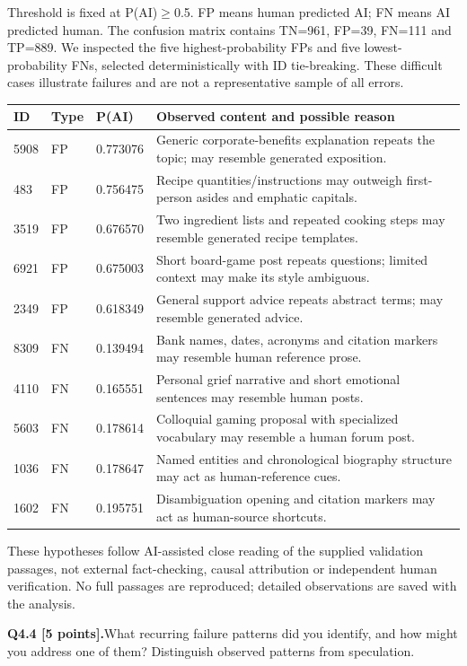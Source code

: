 \documentclass[11pt,letterpaper]{article}
\newcommand{\question}[2]{\needspace{4\baselineskip}\par\addvspace{0.45em}\noindent\textbf{#1}\quad #2\par\nobreak\vspace{0.1em}}
\begin{document}
Threshold is fixed at P(AI)$\geq$0.5. FP means human predicted AI; FN means AI predicted human. The confusion matrix contains TN=961, FP=39, FN=111 and TP=889. We inspected the five highest-probability FPs and five lowest-probability FNs, selected deterministically with ID tie-breaking. These difficult cases illustrate failures and are not a representative sample of all errors.
\begin{small}\begin{longtable}{@{}p{0.45in}p{0.4in}p{0.73in}p{4.6in}@{}}
\toprule ID & Type & P(AI) & Observed content and possible reason \\ \midrule\endhead
5908 & FP & 0.773076 & Generic corporate-benefits explanation repeats the topic; may resemble generated exposition. \\
483 & FP & 0.756475 & Recipe quantities/instructions may outweigh first-person asides and emphatic capitals. \\
3519 & FP & 0.676570 & Two ingredient lists and repeated cooking steps may resemble generated recipe templates. \\
6921 & FP & 0.675003 & Short board-game post repeats questions; limited context may make its style ambiguous. \\
2349 & FP & 0.618349 & General support advice repeats abstract terms; may resemble generated advice. \\
8309 & FN & 0.139494 & Bank names, dates, acronyms and citation markers may resemble human reference prose. \\
4110 & FN & 0.165551 & Personal grief narrative and short emotional sentences may resemble human posts. \\
5603 & FN & 0.178614 & Colloquial gaming proposal with specialized vocabulary may resemble a human forum post. \\
1036 & FN & 0.178647 & Named entities and chronological biography structure may act as human-reference cues. \\
1602 & FN & 0.195751 & Disambiguation opening and citation markers may act as human-source shortcuts. \\
\bottomrule\end{longtable}\end{small}
These hypotheses follow AI-assisted close reading of the supplied validation passages, not external fact-checking, causal attribution or independent human verification. No full passages are reproduced; detailed observations are saved with the analysis.

\question{Q4.4 [5 points].}{What recurring failure patterns did you identify, and how might you address one of them? Distinguish observed patterns from speculation.}
\end{document}
